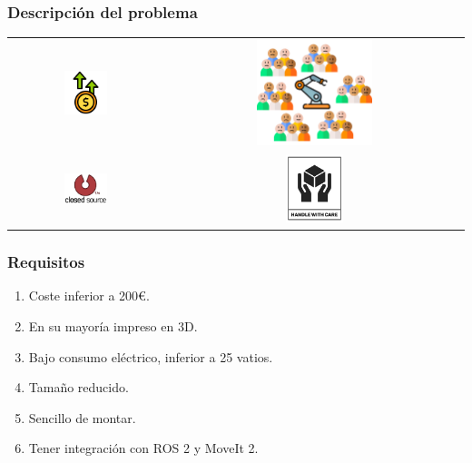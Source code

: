 \documentclass{beamer}
\begin{document}
\begin{frame}
\frametitle{Descripción del problema}
\begin{table}[htbp]
  \centering
  \begin{tabular}{cc}
      \includegraphics[width=0.3\textwidth, valign=m]{figs/high_price.png} & \includegraphics[width=0.4\textwidth, valign=m]{figs/high_people.png} \\
      \includegraphics[width=0.3\textwidth, valign=m]{figs/closed_source.png} & \includegraphics[width=0.2\textwidth, valign=m]{figs/care.png}
  \end{tabular}
\end{table}
\end{frame}
  
\begin{frame}
\frametitle{Requisitos}
\begin{enumerate}
\item Coste inferior a 200\euro.
\item En su mayoría impreso en 3D.
\item Bajo consumo eléctrico, inferior a 25 vatios.
\item Tamaño reducido.
\item Sencillo de montar.
\item Tener integración con ROS 2 y MoveIt 2.
\end{enumerate}
\end{frame}
\end{document}
